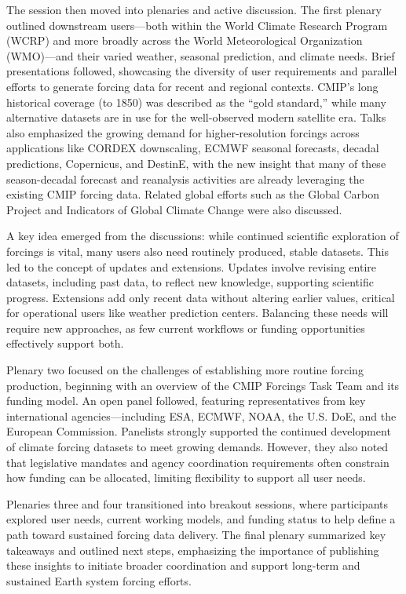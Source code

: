 \documentclass{ametsocV6.1}
\begin{document}
The session then moved into plenaries and active discussion. The first plenary outlined downstream users—both within the World Climate Research Program (WCRP) and more broadly across the World Meteorological Organization (WMO)—and their varied weather, seasonal prediction, and climate needs. Brief presentations followed, showcasing the diversity of user requirements and parallel efforts to generate forcing data for recent and regional contexts. CMIP’s long historical coverage (to 1850) was described as the ``gold standard,'' while many alternative datasets are in use for the well-observed modern satellite era. Talks also emphasized the growing demand for higher-resolution forcings across applications like CORDEX downscaling, ECMWF seasonal forecasts, decadal predictions, Copernicus, and DestinE, with the new insight that many of these season-decadal forecast and reanalysis activities are already leveraging the existing CMIP forcing data. Related global efforts such as the Global Carbon Project \citep{friedlingstein_global_2024} and Indicators of Global Climate Change \citep{forster_indicators_2024} were also discussed.

A key idea emerged from the discussions: while continued scientific exploration of forcings is vital, many users also need routinely produced, stable datasets. This led to the concept of updates and extensions. Updates involve revising entire datasets, including past data, to reflect new knowledge, supporting scientific progress. Extensions add only recent data without altering earlier values, critical for operational users like weather prediction centers. Balancing these needs will require new approaches, as few current workflows or funding opportunities effectively support both.

Plenary two focused on the challenges of establishing more routine forcing production, beginning with an overview of the CMIP Forcings Task Team and its funding model. An open panel followed, featuring representatives from key international agencies—including ESA, ECMWF, NOAA, the U.S. DoE, and the European Commission. Panelists strongly supported the continued development of climate forcing datasets to meet growing demands. However, they also noted that legislative mandates and agency coordination requirements often constrain how funding can be allocated, limiting flexibility to support all user needs.

Plenaries three and four transitioned into breakout sessions, where participants explored user needs, current working models, and funding status to help define a path toward sustained forcing data delivery. The final plenary summarized key takeaways and outlined next steps, emphasizing the importance of publishing these insights to initiate broader coordination and support long-term and sustained Earth system forcing efforts.
\end{document}

